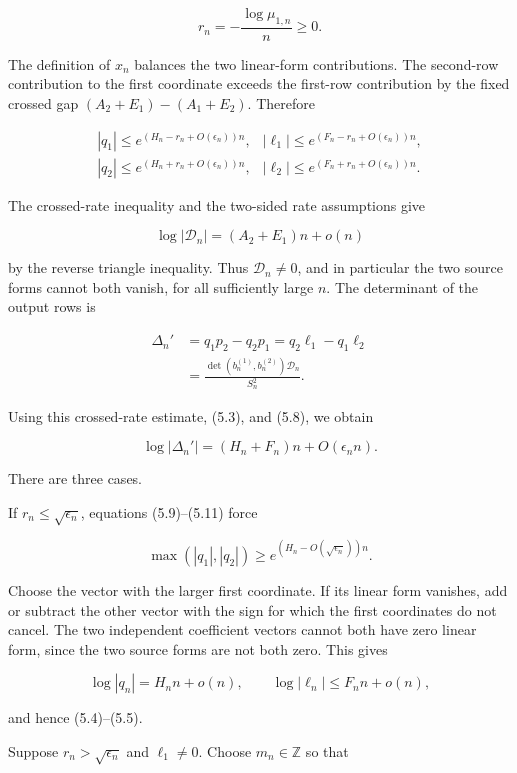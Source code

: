 \documentclass[
  11pt,
]{article}
\begin{document}
\[
 r_n=-\frac{\log\mu_{1,n}}n\ge0.
\]

The definition of \(x_n\) balances the two linear-form contributions.
The second-row contribution to the first coordinate exceeds the
first-row contribution by the fixed crossed gap \((A_2+E_1)-(A_1+E_2)\).
Therefore

\[
\begin{array}{ll}
 |q_1|\le e^{(H_n-r_n+O(\epsilon_n))n},&
 |\ell_1|\le e^{(F_n-r_n+O(\epsilon_n))n},\\
 |q_2|\le e^{(H_n+r_n+O(\epsilon_n))n},&
 |\ell_2|\le e^{(F_n+r_n+O(\epsilon_n))n}.
\end{array}                                          \tag{5.9}
\]

The crossed-rate inequality and the two-sided rate assumptions give

\[
 \log|\mathcal D_n|=(A_2+E_1)n+o(n)
\]

by the reverse triangle inequality. Thus \(\mathcal D_n\ne0\), and in
particular the two source forms cannot both vanish, for all sufficiently
large \(n\). The determinant of the output rows is

\[
\begin{aligned}
 \Delta_n'&=q_1p_2-q_2p_1=q_2\ell_1-q_1\ell_2\\
 &=\frac{\det(b_n^{(1)},b_n^{(2)})\mathcal D_n}{S_n^2}.
\end{aligned}                                        \tag{5.10}
\]

Using this crossed-rate estimate, (5.3), and (5.8), we obtain

\[
 \log|\Delta_n'|=(H_n+F_n)n+O(\epsilon_nn).          \tag{5.11}
\]

There are three cases.

If \(r_n\le\sqrt{\epsilon_n}\), equations (5.9)--(5.11) force

\[
 \max(|q_1|,|q_2|)
 \ge e^{(H_n-O(\sqrt{\epsilon_n}))n}.
\]

Choose the vector with the larger first coordinate. If its linear form
vanishes, add or subtract the other vector with the sign for which the
first coordinates do not cancel. The two independent coefficient vectors
cannot both have zero linear form, since the two source forms are not
both zero. This gives

\[
 \log|q_n|=H_nn+o(n),\qquad
 \log|\ell_n|\le F_nn+o(n),                          \tag{5.12}
\]

and hence (5.4)--(5.5).

Suppose \(r_n>\sqrt{\epsilon_n}\) and \(\ell_1\ne0\). Choose
\(m_n\in\mathbb Z\) so that
\end{document}
